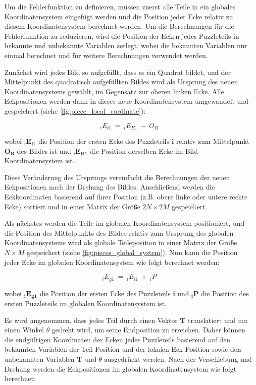 Um die Fehlerfunktion zu definieren, müssen zuerst alle Teile in ein globales Koordinatensystem eingefügt werden und die Position jeder Ecke relativ zu diesem Koordinatensystem berechnet werden. Um die Berechnungen für die Fehlerfunktion zu reduzieren, wird die Position der Ecken jedes Puzzleteils in bekannte und unbekannte Variablen zerlegt, wobei die bekannten Variablen nur einmal berechnet und für weitere Berechnungen verwendet werden.



Zunächst wird jedes Bild so aufgefüllt, dass es ein Quadrat bildet, und der Mittelpunkt des quadratisch aufgefüllten Bildes wird als Ursprung des neuen Koordinatensystems gewählt, im Gegensatz zur oberen linken Ecke. Alle Eckpositionen werden dann in dieses neue Koordinatensystem umgewandelt und gespeichert (siehe \autoref{fig:piece_local_cordinate}):

\begin{equation}
_{i} E_{l1} \ =\ _{i} E_{B1} \ -\ O_{B}
\end{equation}

wobei $\mathbf{{}_{i}E_{1l}}$ die Position der ersten Ecke des Puzzleteils $\mathbf{i}$ relativ zum Mittelpunkt $\mathbf{O_{B}}$ des Bildes ist und $\mathbf{{}_{i}E_{B1}}$ die Position derselben Ecke im Bild-Koordinatensystem ist.


Diese Veränderung des Ursprungs vereinfacht die Berechnungen der neuen Eckpositionen nach der Drehung des Bildes. Anschließend werden die Eckkoordinaten basierend auf ihrer Position (z.B. obere linke oder untere rechte Ecke) sortiert und in einer Matrix der Größe $2N \times 2M$ gespeichert.

Als nächstes werden die Teile im globalen Koordinatensystem positioniert, und die Position des Mittelpunkts des Bildes relativ zum Ursprung des globalen Koordinatensystems wird als globale Teileposition in einer Matrix der Größe $N \times M$ gespeichert (siehe \autoref{fig:pieces_global_system}). Nun kann die Position jeder Ecke im globalen Koordinatensystem wie folgt berechnet werden:

\begin{equation}
_{i} E_{g1} \ =\ _{i} E_{l1} \ +\ _{i} P
\end{equation}


wobei $\mathbf{{}_{i}E_{g1}}$ die Position der ersten Ecke des Puzzleteils $\mathbf{i}$ und $\mathbf{{}_{i}P}$ die Position des ersten Puzzleteils im globalen Koordinatensystem ist.


Es wird angenommen, dass jedes Teil durch einen Vektor $\mathbf{T}$ translatiert und um einen Winkel $\theta$ gedreht wird, um seine Endposition zu erreichen. Daher können die endgültigen Koordinaten der Ecken jedes Puzzleteils basierend auf den bekannten Variablen der Teil-Position und der lokalen Eck-Position sowie den unbekannten Variablen $\mathbf{T}$ und $\theta$ ausgedrückt werden. Nach der Verschiebung und Drehung werden die Eckpositionen im globalen Koordinatensystem wie folgt berechnet:


